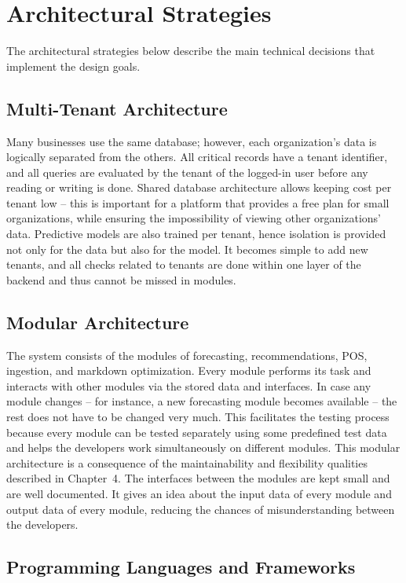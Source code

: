 \documentclass{StockSense}
\begin{document}
\section{Architectural Strategies}

The architectural strategies below describe the main technical decisions that implement the design goals.

\subsection{Multi-Tenant Architecture}\label{sec:multitenant}

Many businesses use the same database; however, each organization’s data is logically separated from the others. All critical records have a tenant identifier, and all queries are evaluated by the tenant of the logged-in user before any reading or writing is done. Shared database architecture allows keeping cost per tenant low – this is important for a platform that provides a free plan for small organizations, while ensuring the impossibility of viewing other organizations’ data. Predictive models are also trained per tenant, hence isolation is provided not only for the data but also for the model. It becomes simple to add new tenants, and all checks related to tenants are done within one layer of the backend and thus cannot be missed in modules.

\subsection{Modular Architecture}

The system consists of the modules of forecasting, recommendations, POS, ingestion, and markdown optimization. Every module performs its task and interacts with other modules via the stored data and interfaces. In case any module changes – for instance, a new forecasting module becomes available – the rest does not have to be changed very much. This facilitates the testing process because every module can be tested separately using some predefined test data and helps the developers work simultaneously on different modules. This modular architecture is a consequence of the maintainability and flexibility qualities described in Chapter~4. The interfaces between the modules are kept small and are well documented. It gives an idea about the input data of every module and output data of every module, reducing the chances of misunderstanding between the developers.

\subsection{Programming Languages and Frameworks}
\end{document}

